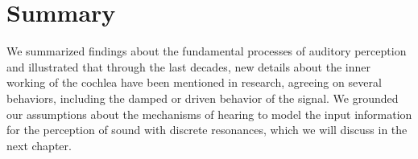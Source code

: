 \section{Summary}
We summarized findings about the fundamental processes of auditory perception and illustrated that through the last decades, new details about the inner working of the cochlea have been mentioned in research, agreeing on several behaviors, including the damped or driven behavior of the signal. We grounded our assumptions about the mechanisms of hearing to model the input information for the perception of sound with discrete resonances, which we will discuss in the next chapter.
